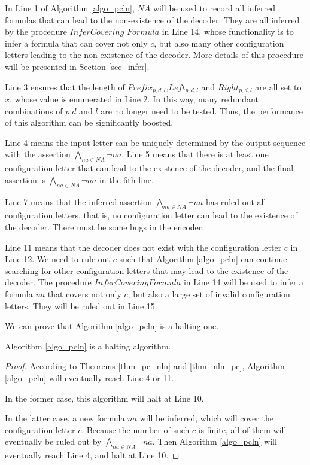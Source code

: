 \documentclass{acm_proc_article-sp}
\begin{document}
In Line 1 of Algorithm \ref{algo_pcln},
$NA$ will be used to record all inferred formulas that can lead to the non-existence of the decoder.
They are all inferred by the procedure $InferCovering$ $Formula$ in Line 14,
whose functionality is to infer a formula that can cover not only $c$,
but also many other configuration letters leading to the non-existence of the decoder.
More details of this procedure will be presented in Section \ref{sec_infer}.

Line 3 ensures that the length of $Prefix_{p,d,l}$,$Left_{p,d,l}$ and $Right_{p,d,l}$ are all set to $x$,
whose value is enumerated in Line 2.
In this way,
many redundant combinations of $p$,$d$ and $l$ are no longer need to be tested.
Thus, the performance of this algorithm can be significantly boosted.

Line 4 means the input letter can be uniquely determined by the output sequence with the assertion $\bigwedge_{na\in NA}\neg na$.
Line 5 means that there is at least one configuration letter that can lead to the existence of the decoder,
and the final assertion is $\bigwedge_{na\in NA}\neg na$ in the 6th line.

Line 7 means that the inferred assertion $\bigwedge_{na\in NA}\neg na$ has ruled out all configuration letters,
that is,
no configuration letter can lead to the existence of the decoder.
There must be some bugs in the encoder.

Line 11 means that the decoder does not exist with the configuration letter $c$ in Line 12.
We need to rule out $c$ such that Algorithm \ref{algo_pcln} can continue searching for other configuration letters that may lead to the existence of the decoder.
The procedure $InferCoveringFormula$ in Line 14 will be used to infer a formula $na$ that covers not only $c$,
but also a large set of invalid configuration letters.
They will be ruled out in Line 15.

We can prove that Algorithm \ref{algo_pcln} is a halting one.
\begin{theorem}[]\label{thm_pcln_halt}
Algorithm \ref{algo_pcln} is a halting algorithm.
\end{theorem}
\begin{proof}
According to Theorems \ref{thm_pc_nln} and \ref{thm_nln_pc},
Algorithm \ref{algo_pcln} will eventually reach Line 4 or 11.

In the former case,
this algorithm will halt at Line 10.

In the latter case,
a new formula $na$ will be inferred,
which will cover the configuration letter $c$.
Because the number of such $c$ is finite,
all of them will eventually be ruled out by $\bigwedge_{na\in NA}\neg na$.
Then Algorithm \ref{algo_pcln} will eventually reach Line 4,
and halt at Line 10.
\end{proof}
\end{document}
